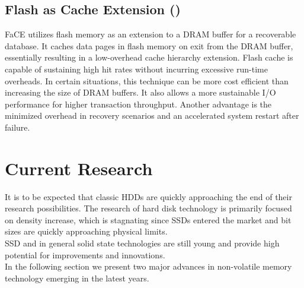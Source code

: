 \documentclass{acm_proc_article-sp}
\begin{document}
\subsection{Flash as Cache Extension ()}
FaCE \cite{kang2012flash} utilizes flash memory as an extension to a DRAM buffer for a recoverable database. It caches data pages in flash memory on exit from the DRAM buffer, essentially resulting in a low-overhead cache hierarchy extension. Flash cache is capable of sustaining high hit rates without incurring excessive run-time overheads. In certain situations, this technique can be more cost efficient than increasing the size of DRAM buffers. It also allows a more sustainable I/O performance for higher transaction throughput. Another advantage is the minimized overhead in recovery scenarios and an accelerated system restart after failure. %

\section{Current Research}
It is to be expected that classic HDDs are quickly approaching the end of their research possibilities. The research of hard disk technology is primarily focused on density increase, which is stagnating since SSDs entered the market and bit sizes are quickly approaching physical limits.
\\
SSD and in general solid state technologies are still young and provide high potential for improvements and innovations.
\\
In the following section we present two major advances in non-volatile memory technology emerging in the latest years.
\end{document}
